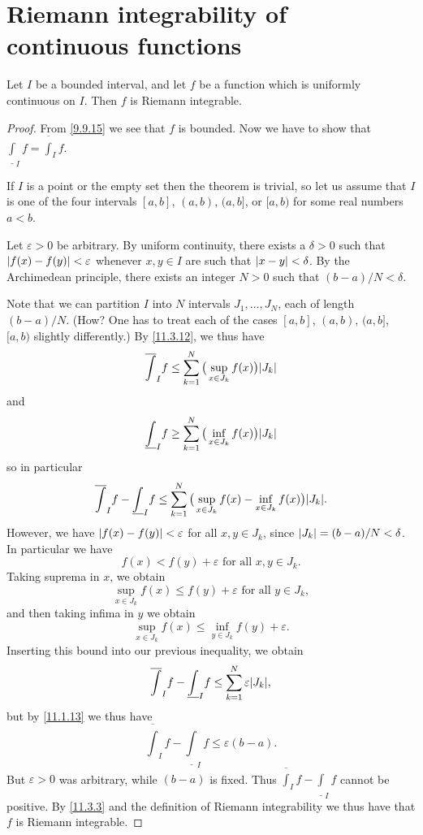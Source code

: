 \section{Riemann integrability of continuous functions}\label{sec:11.5}

\begin{thm}\label{11.5.1}
  Let \(I\) be a bounded interval, and let \(f\) be a function which is uniformly continuous on \(I\).
  Then \(f\) is Riemann integrable.
\end{thm}

\begin{proof}
  From \cref{9.9.15} we see that \(f\) is bounded.
  Now we have to show that \(\underline{\int}_I f = \overline{\int}_I f\).

  If \(I\) is a point or the empty set then the theorem is trivial, so let us assume that \(I\) is one of the four intervals \([a, b]\), \((a, b)\), \((a, b]\), or \([a, b)\) for some real numbers \(a < b\).

      Let \(\varepsilon > 0\) be arbitrary.
      By uniform continuity, there exists a \(\delta > 0\) such that \(\left\lvert f(x) - f(y)\right\rvert < \varepsilon\) whenever \(x, y \in I\) are such that \(\left\lvert x - y\right\rvert < \delta\).
      By the Archimedean principle, there exists an integer \(N > 0\) such that \((b - a) / N < \delta\).

      Note that we can partition \(I\) into \(N\) intervals \(J_1, \dots, J_N\), each of length \((b - a) / N\).
      (How? One has to treat each of the cases \([a, b]\), \((a, b)\), \((a, b]\), \([a, b)\) slightly differently.)
  By \cref{11.3.12}, we thus have
  \[
    \overline{\int}_I f \leq \sum_{k = 1}^N \big(\sup_{x \in J_k} f(x)\big) \abs{J_k}
  \]
  and
  \[
    \underline{\int}_I f \geq \sum_{k = 1}^N \big(\inf_{x \in J_k} f(x)\big) \abs{J_k}
  \]
  so in particular
  \[
    \overline{\int}_I f - \underline{\int}_I f \leq \sum_{k = 1}^N \big(\sup_{x \in J_k} f(x) - \inf_{x \in J_k} f(x)\big) \abs{J_k}.
  \]
  However, we have \(\left\lvert f(x) - f(y)\right\rvert < \varepsilon\) for all \(x, y \in J_k\), since \(\left\lvert J_k\right\rvert = (b - a) / N < \delta\).
  In particular we have
  \[
    f(x) < f(y) + \varepsilon \text{ for all } x, y \in J_k.
  \]
  Taking suprema in \(x\), we obtain
  \[
    \sup_{x \in J_k} f(x) \leq f(y) + \varepsilon \text{ for all } y \in J_k,
  \]
  and then taking infima in \(y\) we obtain
  \[
    \sup_{x \in J_k} f(x) \leq \inf_{y \in J_k} f(y) + \varepsilon.
  \]
  Inserting this bound into our previous inequality, we obtain
  \[
    \overline{\int}_I f - \underline{\int}_I f \leq \sum_{k = 1}^N \varepsilon \abs{J_k},
  \]
  but by \cref{11.1.13} we thus have
  \[
    \overline{\int}_I f - \underline{\int}_I f \leq \varepsilon (b - a).
  \]
  But \(\varepsilon > 0\) was arbitrary, while \((b - a)\) is fixed.
  Thus \(\overline{\int}_I f - \underline{\int}_I f\) cannot be positive.
  By \cref{11.3.3} and the definition of Riemann integrability we thus have that \(f\) is Riemann integrable.
\end{proof}

